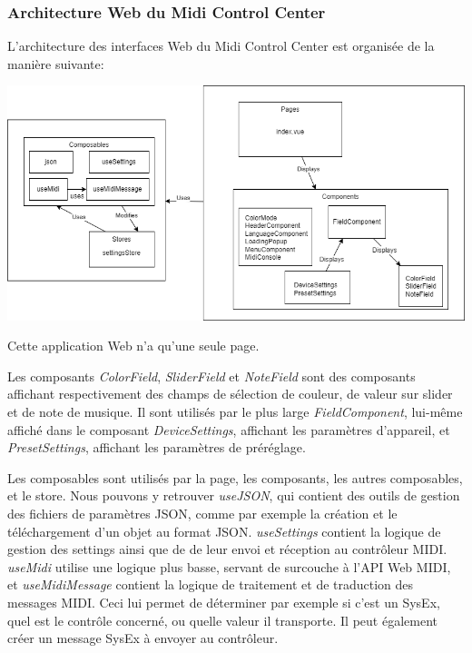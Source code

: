 \documentclass[francais]{rapportPFE}  %
\begin{document}
\subsubsection{Architecture Web du Midi Control Center}

L'architecture des interfaces Web du Midi Control Center est organisée de la manière suivante: 

\begin{center}
    \centering
    \includegraphics[width=15cm]{graphics/minilab3nuxt.png}
    \label{fig:test1}
\end{center}

Cette application Web n'a qu'une seule page.

Les composants \textit{ColorField}, \textit{SliderField} et \textit{NoteField} sont des composants affichant respectivement des champs de sélection de couleur, de valeur sur slider et de note de musique. Il sont utilisés par le plus large \textit{FieldComponent}, lui-même affiché dans le composant \textit{DeviceSettings}, affichant les paramètres d'appareil, et \textit{PresetSettings}, affichant les paramètres de préréglage.

Les composables sont utilisés par la page, les composants, les autres composables, et le store. Nous pouvons y retrouver \textit{useJSON}, qui contient des outils de gestion des fichiers de paramètres JSON, comme par exemple la création et le téléchargement d'un objet au format JSON. \textit{useSettings} contient la logique de gestion des settings ainsi que de de leur envoi et réception au contrôleur MIDI. \textit{useMidi} utilise une logique plus basse, servant de surcouche à l'API Web MIDI, et \textit{useMidiMessage} contient la logique de traitement et de traduction des messages MIDI. Ceci lui permet de déterminer par exemple si c'est un SysEx, quel est le contrôle concerné, ou quelle valeur il transporte. Il peut également créer un message SysEx à envoyer au contrôleur.
\end{document}
